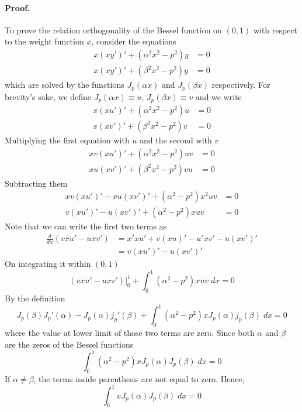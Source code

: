 \documentclass[../main.tex]{subfiles}
\begin{document}
\paragraph*{Proof.} To prove the relation orthogonality of the Bessel function on $(0,1)$ with respect to the weight function $x$, consider the equations 
\begin{align*}
    x(xy')'+(\alpha^2x^2-p^2)y&=0\\
    x(xy')'+(\beta^2x^2-p^2)y&=0
\end{align*}
which are solved by the functions $J_p(\alpha x)$ and $J_p(\beta x)$ respectively. For brevity's sake, we define $J_p(\alpha x)\equiv u$,  $J_p(\beta x)\equiv v$ and we write
\begin{align*}
    x(xu')'+(\alpha^2x^2-p^2)u&=0\\
    x(xv')'+(\beta^2x^2-p^2)v&=0
\end{align*}
Multiplying the first equation with $u$ and the second with $v$
\begin{align*}
    xv(xu')'+(\alpha^2x^2-p^2)uv&=0\\
    xu(xv')'+(\beta^2x^2-p^2)vu&=0
\end{align*}
Subtracting them 
\begin{align*}
    xv(xu')'-xu(xv')'+(\alpha^2-p^2)x^2uv&=0\\
    v(xu')'-u(xv')'+(\alpha^2-p^2)xuv&=0
\end{align*}
Note that we can write the first two terms as
\begin{align*}
    \frac{d}{dx}\left(vxu'-uxv'\right)&=x'xu'+v(xu)'-u'xv'-u(xv')'\\
    &=v(xu')'-u(xv')'
\end{align*}
On integrating it within $(0,1)$
\begin{equation*}
    \left(vxu'-uxv'\right)\bigg|_0^1+\int_{0}^{1}(\alpha^2-p^2)xuv\;dx=0
\end{equation*}
By the definition
\begin{equation*}
    J_p(\beta)J_p'(\alpha) -J_p(\alpha)j_p'(\beta) +\int_{0}^{1}(\alpha^2-p^2)xJ_p(\alpha)j_p(\beta)\;dx=0
\end{equation*}
where the value at lower limit of those two terms are zero. Since both $\alpha$ and $\beta$ are the zeros of the Bessel functions
\begin{equation*}
    \int_{0}^{1}(\alpha^2-p^2)xJ_p(\alpha)J_p(\beta)\;dx=0
\end{equation*}
If $\alpha\neq\beta$, the terms inside parenthesis are not equal to zero. Hence,
\begin{equation*}
    \int_{0}^{1}xJ_p(\alpha)J_p(\beta)\;dx=0
\end{equation*}
\end{document}
